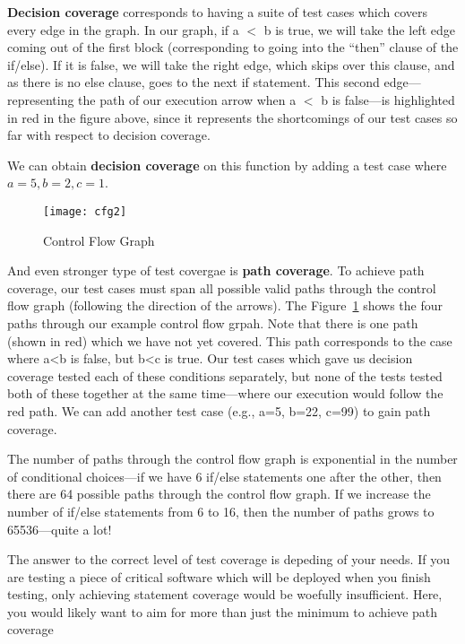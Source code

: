\documentclass[11pt, a4paper]{article}
\begin{document}
\textbf{Decision coverage} corresponds to having a suite of test cases which covers every edge in the graph. In our graph, if a $<$ b is true, we will take the left edge coming out of the first block (corresponding to going into the “then” clause of the if/else). If it is false, we will take the right edge, which skips over this clause, and as there is no else clause, goes to the next if statement. This second edge—representing the path of our execution arrow when a $<$ b is false—is highlighted in red in the figure above, since it represents the shortcomings of our test cases so far with respect to decision coverage.

We can obtain \textbf{decision coverage} on this function by adding a test case where $a=5, b=2, c=1$.




\begin{figure}[htpb]
  \centering
  \texttt{[image: cfg2]}
  \caption{Control Flow Graph}
  \label{fig:control_flow_graph2}
\end{figure}


And even stronger type of test covergae is \textbf{path coverage}. To achieve path coverage, our test cases must span all possible valid paths through the control flow graph (following the direction of the arrows). The Figure~\ref{fig:control_flow_graph2} shows the four paths through our example control flow grpah.
Note that there is one path (shown in red) which we have not yet covered. This path corresponds to the case where a<b is false, but b<c is true. Our test cases which gave us decision coverage tested each of these conditions separately, but none of the tests tested both of these together at the same time—where our execution would follow the red path. We can add another test case (e.g., a=5, b=22, c=99) to gain path coverage.

The number of paths through the control flow graph is exponential in the number of conditional choices—if we have 6 if/else statements one after the other, then there are 64 possible paths through the control flow graph. If we increase the number of if/else statements from 6 to 16, then the number of paths grows to 65536—quite a lot!

The answer to the correct level of test coverage is depeding of your needs. If you are testing a piece of critical software which will be deployed when you finish testing, only achieving statement coverage would be woefully insufficient. Here, you would likely want to aim for more than just the minimum to achieve path coverage
\end{document}
